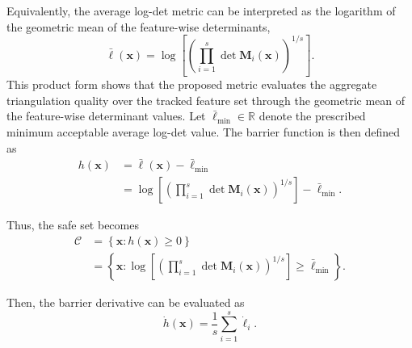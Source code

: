 \documentclass[journal]{IEEEtran}
\newcommand{\R}{\mathbb{R}}
\begin{document}
Equivalently, the average log-det metric can be interpreted as the logarithm of the geometric mean of the feature-wise determinants,
\begin{equation}
  \bar{\ell}(\bm{x})
  =
  \log\left[
  \left(
  \prod_{i=1}^{s}\det\bm{M}_{i}(\bm{x})
  \right)^{1/s}
  \right].
  \label{eq:average_logdet_product}
\end{equation}
This product form shows that the proposed metric evaluates the aggregate triangulation quality over the tracked feature set through the geometric mean of the feature-wise determinant values. Let $\bar{\ell}_{\min}\in\R$ denote the prescribed minimum acceptable average log-det value. The barrier function is then defined as
\begin{align}
    h(\bm{x})
    &= \bar{\ell}(\bm{x}) - \bar{\ell}_{\min} \nonumber\\
    &=
    \log\left[
    \left(
    \prod_{i=1}^{s}\det\bm{M}_{i}(\bm{x})
    \right)^{1/s}
    \right]
    - \bar{\ell}_{\min}.
  \label{eq:h_average_def}
\end{align}

Thus, the safe set becomes
\begin{align}
  \mathcal{C}
  &= \left\{\bm{x}: h(\bm{x})\ge0\right\} \nonumber\\
  &=
  \left\{\bm{x}:
  \log\left[
  \left(
  \prod_{i=1}^{s}\det\bm{M}_{i}(\bm{x})
  \right)^{1/s}
  \right]
  \ge \bar{\ell}_{\min}
  \right\}.
  \label{eq:safe_set_average}
\end{align}

Then, the barrier derivative can be evaluated as
\begin{equation}
  \dot{h}(\bm{x})
  =
  \frac{1}{s}\sum_{i=1}^{s}\dot{\ell}_{i}.
  \label{eq:hdot_average_metric}
\end{equation}
\end{document}

